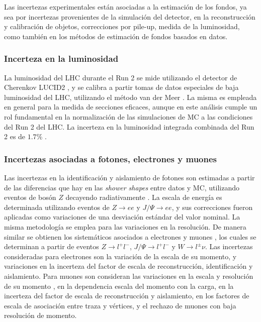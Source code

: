 Las incertezas experimentales están asociadas a la estimación de los fondos, ya sea por incertezas provenientes de la simulación del detector, en la reconstrucción y calibración de objetos, correcciones por pile-up, medida de la luminosidad, como también en los métodos de estimación de fondos basados en datos.


\subsubsection{Incerteza en la luminosidad}

La luminosidad del LHC durante el Run 2 se mide utilizando el detector de Cherenkov LUCID2 \cite{Avoni:2018iuv}, y se calibra a partir tomas de datos especiales de baja luminosidad del LHC, utilizando el método van der Meer \cite{vanderMeer:296752,Grafstrom:2153734}. La misma es empleada en general para la medida de secciones eficaces, aunque en este análisis cumple un rol fundamental en la normalización de las simulaciones de MC a las condiciones del Run 2 del LHC. La incerteza en la luminosidad integrada combinada del Run 2 es de $1.7$\% \cite{ATLAS-CONF-2019-021}.


\subsubsection{Incertezas asociadas a fotones, electrones y muones}

Las incertezas en la identificación y aislamiento de fotones son estimadas a partir de las diferencias que hay en las \textit{shower shapes}
entre datos y MC, utilizando eventos de bosón $Z$ decayendo radiativamente \cite{PERF-2013-04}. La escala de energía es determinada utilizando eventos de $Z\to ee$ y $J/\Psi \to ee$, y sus correcciones fueron aplicadas como variaciones de una desviación estándar del valor nominal. La misma metodología se emplea para las variaciones en la resolución.
De manera similar se obtienen los sistemáticos asociados a electrones \cite{ATLAS-CONF-2014-032} y muones \cite{PERF-2015-10}, los cuales se determinan a partir de eventos $Z\to l^+l^-$, $J/\Psi\to l^+l^-$ y $W\to l^\pm \nu$. 
Las incertezas consideradas para electrones son la variación de la escala de su momento, y variaciones en la incerteza del factor de escala de reconstrucción, identificación y aislamiento.
Para muones son consideran las variaciones en la escala y resolución de su momento 
, en la dependencia escala del momento con la carga, en la incerteza del factor de escala de reconstrucción y aislamiento, en los factores de escala de asociación entre traza y vértices, y el rechazo de muones con baja resolución de momento.


